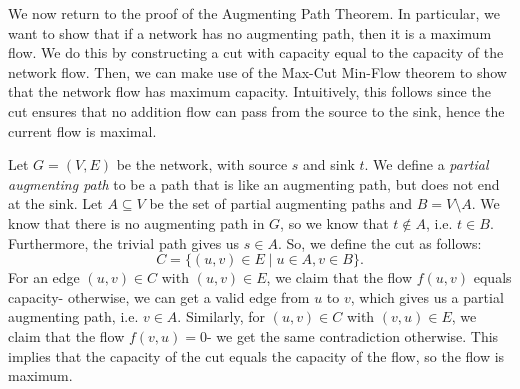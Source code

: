 \documentclass[a4paper, openany]{memoir}
\begin{document}

    We now return to the proof of the Augmenting Path Theorem. In particular, we want to show that if a network has no augmenting path, then it is a maximum flow. We do this by constructing a cut with capacity equal to the capacity of the network flow. Then, we can make use of the Max-Cut Min-Flow theorem  to show that the network flow has maximum capacity. Intuitively, this follows since the cut ensures that no addition flow can pass from the source to the sink, hence the current flow is maximal.

    Let $G = (V, E)$ be the network, with source $s$ and sink $t$. We define a \emph{partial augmenting path} to be a path that is like an augmenting path, but does not end at the sink. Let $A \subseteq V$ be the set of partial augmenting paths and $B = V \setminus A$. We know that there is no augmenting path in $G$, so we know that $t \not\in A$, i.e. $t \in B$. Furthermore, the trivial path gives us $s \in A$. So, we define the cut as follows:
    \[C = \{(u, v) \in E \mid u \in A, v \in B\}.\]
    For an edge $(u, v) \in C$ with $(u, v) \in E$, we claim that the flow $f(u, v)$ equals capacity- otherwise, we can get a valid edge from $u$ to $v$, which gives us a partial augmenting path, i.e. $v \in A$. Similarly, for $(u, v) \in C$ with $(v, u) \in E$, we claim that the flow $f(v, u) = 0$- we get the same contradiction otherwise. This implies that the capacity of the cut equals the capacity of the flow, so the flow is maximum. 
\end{document}
